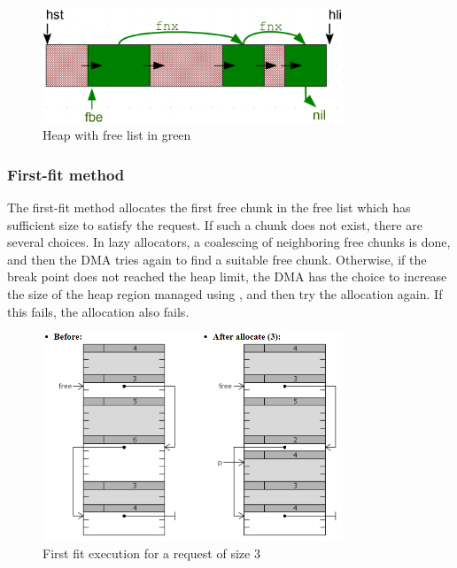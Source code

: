 \begin{figure}[htbp]
    \begin{center}
        \includegraphics[width=0.8\textwidth]{figures/freelist}
    \caption{Heap with free list in green}
    \label{fig:freelist}
    \end{center}
\end{figure}

\subsubsection{First-fit method}
The first-fit method allocates the first free chunk in the free list which has sufficient size to satisfy the request. If such a chunk does not exist, there are several choices.
In lazy allocators, a coalescing of neighboring free chunks is done, and then the DMA tries again to find a suitable free chunk.
Otherwise, if the break point does not reached the heap limit, the DMA has the choice to increase the size of the heap region managed using , and then try the allocation again.
If this fails, the allocation also fails.

\begin{figure}[htbp]
    \begin{center}
        \includegraphics[width=0.8\textwidth]{figures/FF_alg}
    \vspace{-3eX}
    \caption{First fit execution for a request of size 3}
    \label{ff_alg}
    \end{center}
    \vspace{-3eX}
\end{figure}

